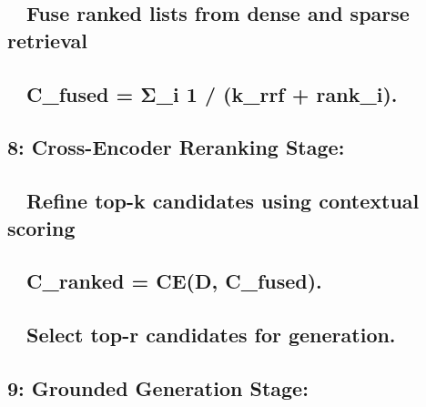 \subsection*{ Fuse ranked lists from dense and sparse
retrieval}\label{fuse-ranked-lists-from-dense-and-sparse-retrieval}

\subsection*{ C\_fused = Σ\_i 1 / (k\_rrf +
rank\_i).}\label{c_fused-ux3c3_i-1-k_rrf-rank_i.}

\subsection*{8: Cross-Encoder Reranking
Stage:}\label{cross-encoder-reranking-stage}

\subsection*{ Refine top-k candidates using contextual
scoring}\label{refine-top-k-candidates-using-contextual-scoring}

\subsection*{ C\_ranked = CE(D, C\_fused).}\label{c_ranked-ced-c_fused.}

\subsection*{ Select top-r candidates for
generation.}\label{select-top-r-candidates-for-generation.}

\subsection*{9: Grounded Generation
Stage:}\label{grounded-generation-stage}

